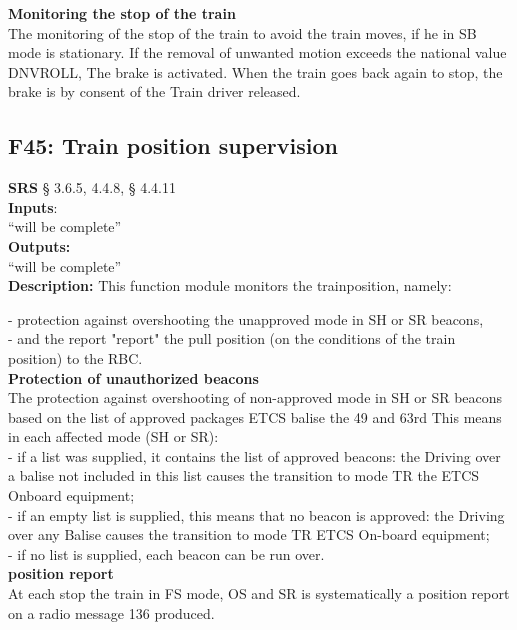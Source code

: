 \documentclass{template/openetcs_report}
\begin{document}
\textbf{Monitoring the stop of the train }\\
The monitoring of the stop of the train to avoid the train moves, if he in 
SB mode is stationary. 
If the removal of unwanted motion exceeds the national value DNVROLL, 
The brake is activated. 
When the train goes back again to stop, the brake is by consent of the 
Train driver released.\\


\subsection {F45: Train position supervision}
\textbf{SRS} § 3.6.5, 4.4.8, § 4.4.11\\

\textbf{Inputs}:\\
``will be complete''\\
 
 \textbf{Outputs:}\\
 ``will be complete''\\
 
 \textbf{Description:} 
 This function module monitors the trainposition, namely: 

- protection against overshooting the unapproved mode in SH or SR beacons, \\

- and the report "report" the pull position (on the conditions of the train position) to the 
RBC. \\

\textbf{Protection of unauthorized beacons}\\
The protection against overshooting of non-approved mode in SH or SR beacons based 
on the list of approved packages ETCS balise the 49 and 63rd 
This means in each affected mode (SH or SR): \\
 
- if a list was supplied, it contains the list of approved beacons: the 
Driving over a balise not included in this list causes the transition to mode TR 
the ETCS Onboard equipment; \\

- if an empty list is supplied, this means that no beacon is approved: the 
Driving over any Balise causes the transition to mode TR ETCS
On-board equipment; \\

- if no list is supplied, each beacon can be run over. \\


\textbf{position report }\\
At each stop the train in FS mode, OS and SR is systematically a position report on 
a radio message 136 produced. \\
\end{document}
